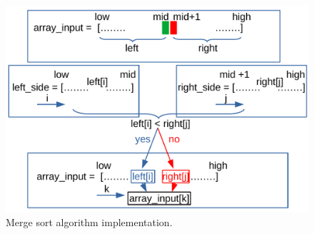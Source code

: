 \begin{figure}[H]
	\begin{center}
		\includegraphics[scale=.6]{chapters/searchandsorting/images/sorting_7.pdf}
		\caption[Merge sort algorithm implementation.]{Merge sort algorithm implementation.}
		\label{sorting_7}
	\end{center}
\end{figure}

